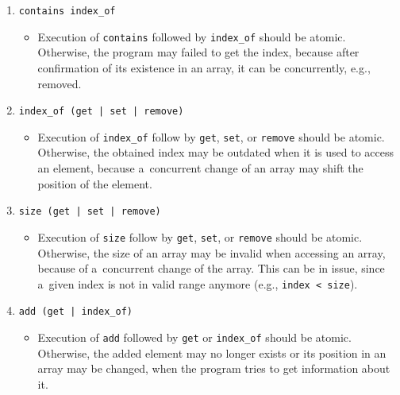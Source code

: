 \begin{enumerate}[label={$ (\varrho_{\arabic*}) $}]
    \item
        \texttt{contains index\_of}
        \begin{itemize}
            \item
                Execution of \texttt{contains} followed by \texttt{index\_of}
                should be atomic. Otherwise, the program may failed to
                get the index, because after confirmation of its existence
                in an array, it can be concurrently, e.g., removed.
        \end{itemize}

    \item
        \texttt{index\_of (get | set | remove)}
        \begin{itemize}
            \item
                Execution of \texttt{index\_of} follow by \texttt{get},
                \texttt{set}, or \texttt{remove} should be atomic. Otherwise,
                the obtained index may be outdated when it is used to access
                an element, because a~concurrent change of an array may shift
                the position of the element.
        \end{itemize}

    \item
        \texttt{size (get | set | remove)}
        \begin{itemize}
            \item
                Execution of \texttt{size} follow by \texttt{get},
                \texttt{set}, or \texttt{remove} should be atomic. Otherwise,
                the size of an array may be invalid when accessing an array,
                because of a~concurrent change of the array. This can be
                in issue, since a~given index is not in valid range
                anymore (e.g., \texttt{index < size}).
        \end{itemize}

    \item
        \texttt{add (get | index\_of)}
        \begin{itemize}
            \item
                Execution of \texttt{add} followed by \texttt{get} or
                \texttt{index\_of} should be atomic. Otherwise, the added
                element may no longer exists or its position in an array
                may be changed, when the program tries to get information
                about it.
        \end{itemize}
\end{enumerate}

